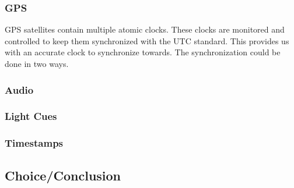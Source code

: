 \subsubsection{GPS}
GPS satellites contain multiple atomic clocks.
These clocks are monitored and controlled to keep them synchronized with the UTC standard.
This provides us with an accurate clock to synchronize towards.
The synchronization could be done in two ways.
\subsubsection{Audio}
\subsubsection{Light Cues}
\subsubsection{Timestamps}


\subsection{Choice/Conclusion}

